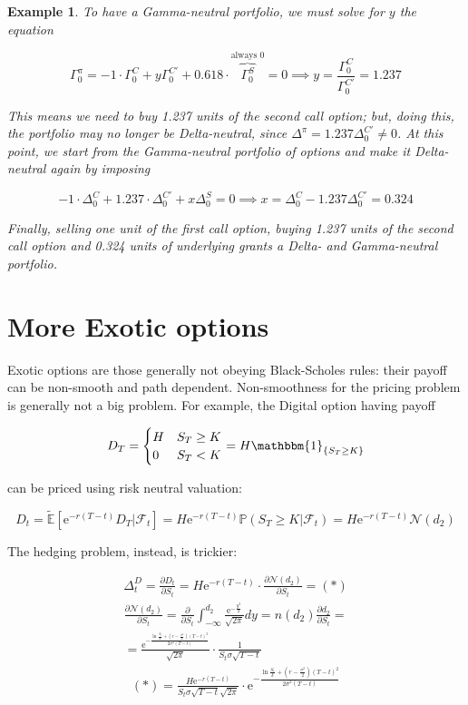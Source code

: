 \documentclass[oneside,titlepage,headinclude,12pt,a4paper,BCOR5mm,footinclude]{book}
\theoremstyle{defn}
\newtheorem{example}{Example}
\newcommand{\eexp}{\mathrm{e}}
\newcommand{\rnE}[1]{\mathbb{\tilde E}\left[ {#1} \right]}
\newcommand\NN{\mathcal{N}}
\newcommand\de\partial
\begin{document}
\begin{example}
  To have a Gamma-neutral portfolio, we must solve for $y$ the equation

  \[
    \Gamma_0^\pi = -1 \cdot \Gamma_0^C + y\Gamma_0^{C'} + 0.618\cdot \overbrace{\Gamma_0^S}^{\text{always }0} = 0
    \implies y = \frac{\Gamma_0^C}{\Gamma_0^{C'}} = 1.237
  \]

  This means we  need to buy 1.237  units of the second call  option; but, doing
  this,  the portfolio  may  no  longer be  Delta-neutral,  since $\Delta^\pi  =
  1.237\Delta_0^{C'} \neq  0$. At  this point, we  start from  the Gamma-neutral
  portfolio of options and make it Delta-neutral again by imposing

  \[
    -1\cdot\Delta_0^C + 1.237\cdot\Delta_0^{C'} + x\Delta_0^S = 0
    \implies
    x = \Delta_0^C - 1.237\Delta_0^{C'} = 0.324
  \]

  Finally, selling one unit of the first  call option, buying 1.237 units of the
  second  call  option  and  0.324  units of  underlying  grants  a  Delta-  and
  Gamma-neutral portfolio.

\end{example}

\section{More Exotic options}

Exotic options are those generally not obeying Black-Scholes rules: their payoff
can be non-smooth and path dependent.  Non-smoothness for the pricing problem is
generally not a big problem. For example, the Digital option having payoff

\[
  D_T = \begin{cases} H & S_T\geq K \\ 0 & S_T<K \end{cases} = H\mathbbm{1}_{\{S_T\geq K\}}
\]

can be priced using risk neutral valuation:

\[
  D_t = \rnE{\eexp^{-r(T-t)}D_T\Big|\mathcal{F}_t} = H\eexp^{-r(T-t)}\mathbb{P}(S_T\geq K|\mathcal{F}_t)
  = H\eexp^{-r(T-t)}\NN(d_2)
\]

The hedging problem, instead, is trickier:

\begin{gather*}
  \Delta^D_t = \frac{\de D_t}{\de S_t} = H\eexp^{-r(T-t)}\cdot \frac{\de \NN(d_2)}{\de S_t} = (*)
\end{gather*}
\begin{gather*}
  \frac{\de \NN(d_2)}{\de S_t} = \frac{\de}{\de S_t}\int_{-\infty}^{d_2} \frac{\eexp^{-\frac{y^2}{2}}}{\sqrt{2\pi}}dy
  = n(d_2)\frac{\de d_2}{\de S_t} = \\
  = \frac{\eexp^{-\frac{\ln\frac{S_t}{k} + \left(r-\frac{\sigma^2}{2}\right)(T-t)^2}{2\sigma^2(T-t)}}}{\sqrt{2\pi}}
  \cdot \frac{1}{S_t\sigma\sqrt{T-t}}
\end{gather*}
\begin{gather*}
  (*) = \frac{H\eexp^{-r(T-t)}}{S_t\sigma\sqrt{T-t}\sqrt{2\pi}}\cdot\eexp^{-\frac{\ln\frac{S_t}{k} + \left(r-\frac{\sigma^2}{2}\right)(T-t)^2}{2\sigma^2(T-t)}}
\end{gather*}
\end{document}
